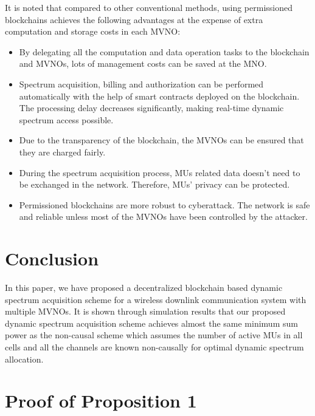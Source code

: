 \documentclass[journal]{IEEEtran}
\begin{document}
{\color{red}It is noted that compared to other conventional methods, using permissioned blockchains achieves the following advantages at the expense of extra computation and storage costs in each MVNO:
\begin{itemize}
\item By delegating all the computation and data operation tasks to the blockchain and MVNOs, lots of management costs can be saved at the MNO.
\item Spectrum acquisition, billing and authorization can be performed automatically with the help of smart contracts deployed on the blockchain. The processing delay decreases significantly, making real-time dynamic spectrum access possible.
\item Due to the transparency of the blockchain, the MVNOs can be ensured that they are charged fairly.
\item During the spectrum acquisition process, MUs related data doesn't need to be exchanged in the network. Therefore, MUs' privacy can be protected.
\item Permissioned blockchains are more robust to cyberattack. The network is safe and reliable unless most of the MVNOs have been controlled by the attacker.
\end{itemize}
}


\section{Conclusion}
In this paper, we have proposed a decentralized blockchain based dynamic spectrum acquisition scheme for a wireless downlink communication system with multiple MVNOs. It is shown through simulation results that our proposed dynamic spectrum acquisition scheme achieves almost the same minimum sum power as the non-causal scheme which assumes the number of active MUs in all cells and all the channels are known non-causally for optimal dynamic spectrum allocation.
\appendices
\section{Proof of Proposition 1}
\end{document}
